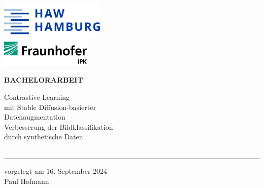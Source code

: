 \begin{titlepage}
  \color{haw}
  \raggedright
  \hspace{\fill}\includegraphics[width=5.00cm]{logo_haw.jpg}\\
  \vspace{0.4cm}
  \hspace{\fill}\includegraphics[width=4.30cm]{logo_fraunhofer-ipk.png}\\

  \vspace{5cm}

  \setmainfont{Open Sans}
  \small
  \textbf{BACHELORARBEIT}

  \vspace{8mm}

  \begin{minipage}{0.8\linewidth}
    \setmainfont{Martel Heavy} \LARGE
    Contrastive Learning\\[1mm] %
    mit Stable Diffusion-basierter\\[1mm]
    Datenaugmentation\\[4mm]
    \setmainfont{Open Sans} \Large
    Verbesserung der Bildklassifikation\\[1mm]
    durch synthetische Daten\\[1mm]
    \,\rule{11mm}{1.2mm}
  \end{minipage}

  \vspace{9.2mm}

  vorgelegt am 16. September 2024\\
  Paul Hofmann


\end{titlepage}

